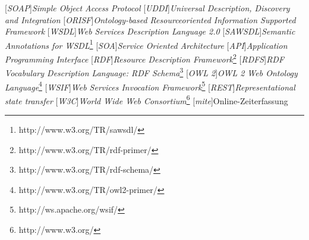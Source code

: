 
[\emph{SOAP}]{\emph{Simple Object Access Protocol}}
[\emph{UDDI}]{\emph{Universal Description, Discovery and Integration}}
[\emph{ORISF}]{\emph{Ontology-based Resourceoriented Information Supported Framework}}
[\emph{WSDL}]{\emph{Web Services Description Language 2.0}}
[\emph{SAWSDL}]{\emph{Semantic Annotations for WSDL}\footnote{http://www.w3.org/TR/sawsdl/}}
[\emph{SOA}]{\emph{Service Oriented Architecture}}
[\emph{API}]{\emph{Application Programming Interface}}
[\emph{RDF}]{\emph{Resource Description Framework}\footnote{http://www.w3.org/TR/rdf-primer/}}
[\emph{RDFS}]{\emph{RDF Vocabulary Description Language: RDF Schema}\footnote{http://www.w3.org/TR/rdf-schema/}}
[\emph{OWL 2}]{\emph{OWL 2 Web Ontology Language}\footnote{http://www.w3.org/TR/owl2-primer/}}
[\emph{WSIF}]{\emph{Web Services Invocation Framework}\footnote{http://ws.apache.org/wsif/}}
[\emph{REST}]{\emph{Representational state transfer}}
[\emph{W3C}]{\emph{World Wide Web Consortium}\footnote{http://www.w3.org/}}
[\emph{mite}]{Online-Zeiterfassung}



\newcommand{\ws}{Webservice }
\newcommand{\wss}{Webservices }
\newcommand{\restapi}{\emph{RESTful} \ac{API} }
\newcommand{\restapis}{\emph{RESTful} \ac{API}\emph{s} }